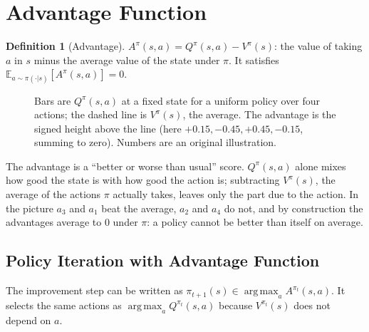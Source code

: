 \documentclass[11pt,a4paper]{article}
\newcommand{\E}{\mathbb{E}}
\DeclareMathOperator*{\argmax}{arg\,max}
\theoremstyle{plain}
\theoremstyle{definition}
\newtheorem{definition}[theorem]{Definition}
\theoremstyle{remark}
\begin{document}
\section{Advantage Function}
\begin{definition}[Advantage]\label{def:adv}
$A^\pi(s,a)=Q^\pi(s,a)-V^\pi(s)$: the value of taking $a$ in $s$ minus the average value of the state under $\pi$. It satisfies $\E_{a\sim\pi(\cdot|s)}[A^\pi(s,a)]=0$.
\end{definition}

\begin{figure}[h]
\centering
{}
\caption{Bars are $Q^\pi(s,a)$ at a fixed state for a uniform policy over four actions; the dashed line is $V^\pi(s)$, the average. The advantage is the signed height above the line (here $+0.15,-0.45,+0.45,-0.15$, summing to zero). Numbers are an original illustration.}
\end{figure}

\begin{intuition}
The advantage is a ``better or worse than usual'' score. $Q^\pi(s,a)$ alone mixes how good the state is with how good the action is; subtracting $V^\pi(s)$, the average of the actions $\pi$ actually takes, leaves only the part due to the action. In the picture $a_3$ and $a_1$ beat the average, $a_2$ and $a_4$ do not, and by construction the advantages average to $0$ under $\pi$: a policy cannot be better than itself on average.
\end{intuition}

\subsection{Policy Iteration with Advantage Function}
The improvement step can be written as $\pi_{t+1}(s)\in\argmax_aA^{\pi_t}(s,a)$. It selects the same actions as $\argmax_aQ^{\pi_t}(s,a)$ because $V^{\pi_t}(s)$ does not depend on $a$.
\end{document}
